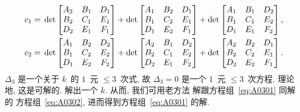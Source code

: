 \documentclass[../libro.tex]{subfiles}
\begin{document}
\begin{align*}
    c_1
    = {} &
     \det
    \begin{bmatrix}
        A_2 & B_1 & D_1 \\
        B_2 & C_1 & E_1 \\
        D_2 & E_1 & F_1 \\
    \end{bmatrix} 
    +
     \det
    \begin{bmatrix}
        A_1 & B_2 & D_1 \\
        B_1 & C_2 & E_1 \\
        D_1 & E_2 & F_1 \\
    \end{bmatrix} 
    +
     \det
    \begin{bmatrix}
        A_1 & B_1 & D_2 \\
        B_1 & C_1 & E_2 \\
        D_1 & E_1 & F_2 \\
    \end{bmatrix} , \\
    c_2
    = {} &
     \det
    \begin{bmatrix}
        A_1 & B_2 & D_2 \\
        B_1 & C_2 & E_2 \\
        D_1 & E_2 & F_2 \\
    \end{bmatrix} 
    +
     \det
    \begin{bmatrix}
        A_2 & B_1 & D_2 \\
        B_2 & C_1 & E_2 \\
        D_2 & E_1 & F_2 \\
    \end{bmatrix} 
    +
     \det
    \begin{bmatrix}
        A_2 & B_2 & D_1 \\
        B_2 & C_2 & E_1 \\
        D_2 & E_2 & F_1 \\
    \end{bmatrix} .
\end{align*}
\(\Delta_3\) 是一个关于 \(k\)~的 \(1\)~元 \({\leq} 3\)~次式,
故 \(\Delta_3 = 0\) 是一个 \(1\)~元 \({\leq} 3\)~次方程.
理论地, 这是可解的.
解出一个 \(k\).
从而, 我们可用老方法%
解跟方程组~\eqref{eq:A0301} 同解的%
方程组~\eqref{eq:A0302},
进而得到方程组~\eqref{eq:A0301} 的解.
\end{document}
